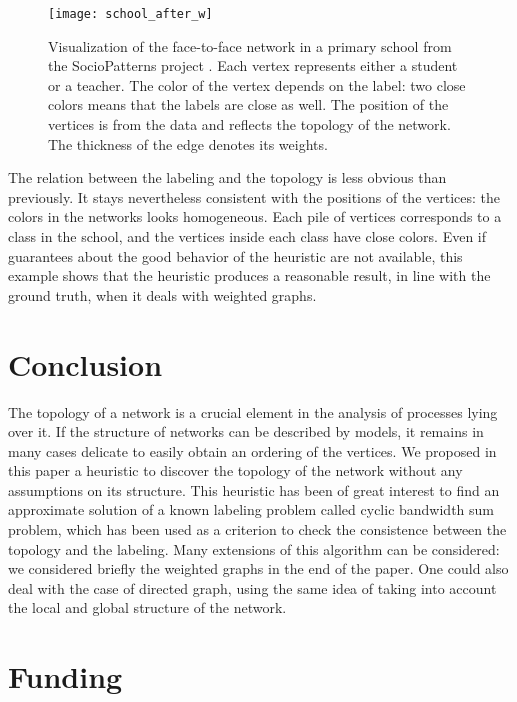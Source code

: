 \documentclass{scrartcl}
\theoremstyle{plain}
\begin{document}
\begin{figure}[htp]
  \centering
	\texttt{[image: school\_after\_w]}

\caption{\label{fig:school}Visualization of the face-to-face network in a 
primary school from the SocioPatterns project \cite{Fournet2014}. Each vertex 
represents either a student or a teacher. The color of the vertex depends on the 
label: two close colors means that the labels are close as well. The position 
of the vertices is from the data and reflects the topology of the network. The 
thickness of the edge denotes its weights.}
\end{figure}

The relation between the labeling and the topology is less obvious than 
previously. It stays nevertheless consistent with the positions of the vertices: 
the colors in the networks looks homogeneous. Each pile of vertices corresponds 
to a class in the school, and the vertices inside each class have close colors. 
Even if guarantees about the good behavior of the heuristic are not available, 
this example shows that the heuristic produces a reasonable result, in line with 
the ground truth, when it deals with weighted graphs.


 



\makeatletter{}\section{Conclusion}
\label{sec:conclusion}

The topology of a network is a crucial element in the analysis of processes 
lying over it. If the structure of networks can be described by models, 
it remains in many cases delicate to easily obtain an ordering of the vertices. 
We proposed in this paper a heuristic to discover the topology of the network 
without any assumptions on its structure. This heuristic has been of great 
interest to find an approximate solution of a known labeling problem called 
cyclic bandwidth sum problem, which has been used as a criterion to check the 
consistence between the topology and the labeling. Many extensions of 
this algorithm can be considered: we considered briefly the weighted graphs in 
the end of the paper. One could also deal with the case of directed graph, 
using the same idea of taking into account the local and global structure of 
the network. 


\section*{Funding}
\end{document}

